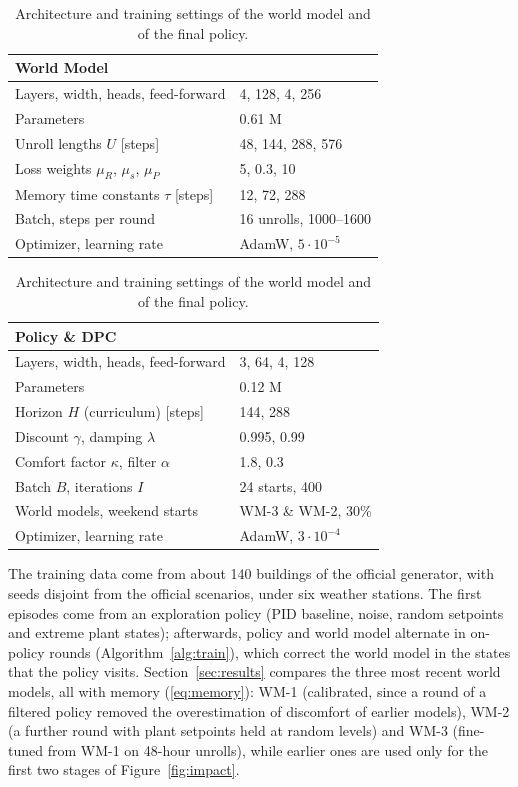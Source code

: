 \documentclass{article}
\begin{document}
\begin{table}[H]
\caption{Architecture and training settings of the world model and of the final policy.}
\label{tab:hyper}
\centering
\scriptsize
\setlength{\tabcolsep}{3pt}
\begin{minipage}[t]{0.49\linewidth}\centering
\begin{tabular}{ll}
\toprule
\multicolumn{2}{l}{World Model} \\
\midrule
Layers, width, heads, feed-forward & 4, 128, 4, 256 \\
Parameters & 0.61 M \\
Unroll lengths $U$ [steps] & 48, 144, 288, 576 \\
Loss weights $\mu_R$, $\mu_s$, $\mu_P$ & 5, 0.3, 10 \\
Memory time constants $\tau$ [steps] & 12, 72, 288 \\
Batch, steps per round & 16 unrolls, 1000--1600 \\
Optimizer, learning rate & AdamW, $5\cdot10^{-5}$ \\
\bottomrule
\end{tabular}
\end{minipage}\hfill
\begin{minipage}[t]{0.49\linewidth}\centering
\begin{tabular}{ll}
\toprule
\multicolumn{2}{l}{Policy \& DPC} \\
\midrule
Layers, width, heads, feed-forward & 3, 64, 4, 128 \\
Parameters & 0.12 M \\
Horizon $H$ (curriculum) [steps] & 144, 288 \\
Discount $\gamma$, damping $\lambda$ & 0.995, 0.99 \\
Comfort factor $\kappa$, filter $\alpha$ & 1.8, 0.3 \\
Batch $B$, iterations $I$ & 24 starts, 400 \\
World models, weekend starts & WM-3 \& WM-2, 30\% \\
Optimizer, learning rate & AdamW, $3\cdot10^{-4}$ \\
\bottomrule
\end{tabular}
\end{minipage}
\end{table}


The training data come from about 140 buildings of the official generator, with seeds disjoint from the official scenarios, under six weather stations. The first episodes come from an exploration policy (PID baseline, noise, random setpoints and extreme plant states); afterwards, policy and world model alternate in on-policy rounds (Algorithm~\ref{alg:train}), which correct the world model in the states that the policy visits. Section~\ref{sec:results} compares the three most recent world models, all with memory (\ref{eq:memory}): WM-1 (calibrated, since a round of a filtered policy removed the overestimation of discomfort of earlier models), WM-2 (a further round with plant setpoints held at random levels) and WM-3 (fine-tuned from WM-1 on 48-hour unrolls), while earlier ones are used only for the first two stages of Figure~\ref{fig:impact}.
\end{document}
